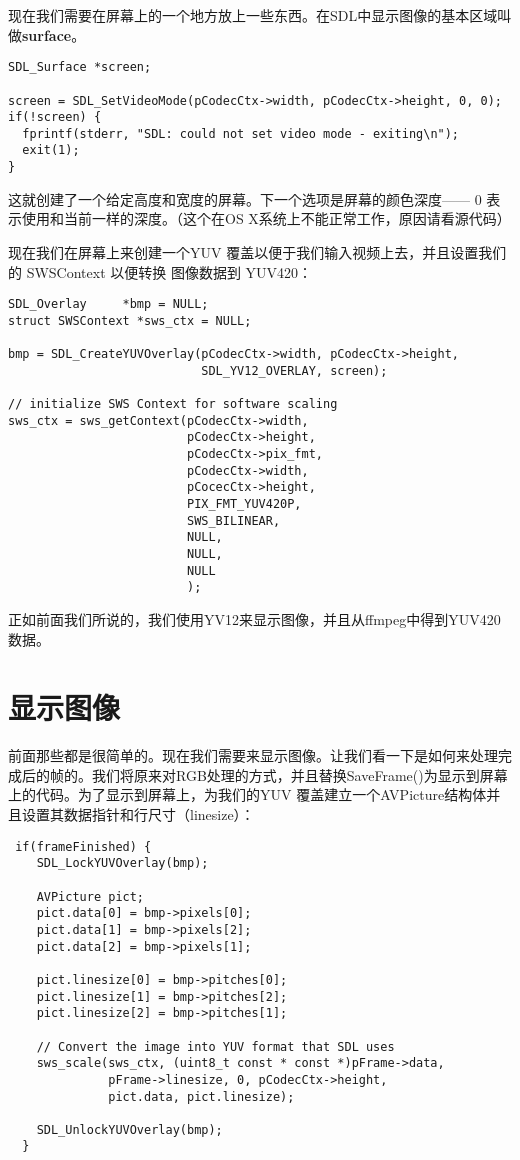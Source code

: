 现在我们需要在屏幕上的一个地方放上一些东西。在SDL中显示图像的基本区域叫做\textbf{surface}。

\begin{lstlisting}
SDL_Surface *screen;

screen = SDL_SetVideoMode(pCodecCtx->width, pCodecCtx->height, 0, 0);
if(!screen) {
  fprintf(stderr, "SDL: could not set video mode - exiting\n");
  exit(1);
}
\end{lstlisting}

这就创建了一个给定高度和宽度的屏幕。下一个选项是屏幕的颜色深度—— 0 表示使用和当前一样的深度。（这个在OS X系统上不能正常工作，原因请看源代码）

现在我们在屏幕上来创建一个YUV 覆盖以便于我们输入视频上去，并且设置我们的 SWSContext 以便转换 图像数据到 YUV420：

\begin{lstlisting}
SDL_Overlay     *bmp = NULL;
struct SWSContext *sws_ctx = NULL;

bmp = SDL_CreateYUVOverlay(pCodecCtx->width, pCodecCtx->height,
                           SDL_YV12_OVERLAY, screen);

// initialize SWS Context for software scaling
sws_ctx = sws_getContext(pCodecCtx->width,
						 pCodecCtx->height,
						 pCodecCtx->pix_fmt,
						 pCodecCtx->width,
						 pCocecCtx->height,
						 PIX_FMT_YUV420P,
						 SWS_BILINEAR,
						 NULL,
						 NULL,
						 NULL
						 );
\end{lstlisting}

正如前面我们所说的，我们使用YV12来显示图像，并且从ffmpeg中得到YUV420数据。

\section{显示图像}

前面那些都是很简单的。现在我们需要来显示图像。让我们看一下是如何来处理完成后的帧的。我们将原来对RGB处理的方式，并且替换SaveFrame()为显示到屏幕上的代码。为了显示到屏幕上，为我们的YUV 覆盖建立一个AVPicture结构体并且设置其数据指针和行尺寸（linesize）：

\begin{lstlisting}
 if(frameFinished) {
    SDL_LockYUVOverlay(bmp);

    AVPicture pict;
    pict.data[0] = bmp->pixels[0];
    pict.data[1] = bmp->pixels[2];
    pict.data[2] = bmp->pixels[1];

    pict.linesize[0] = bmp->pitches[0];
    pict.linesize[1] = bmp->pitches[2];
    pict.linesize[2] = bmp->pitches[1];

    // Convert the image into YUV format that SDL uses
	sws_scale(sws_ctx, (uint8_t const * const *)pFrame->data,
			  pFrame->linesize, 0, pCodecCtx->height,
			  pict.data, pict.linesize);

    SDL_UnlockYUVOverlay(bmp);
  }
\end{lstlisting}

